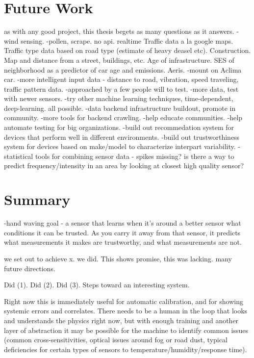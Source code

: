 \section{Future Work}

as with any good project, this thesis begets as many questions as it answers.
-wind sensing.
-pollen, scrape. no api.  realtime Traffic data a la google maps.  Traffic type data based on road type (estimate of heavy deasel etc).  Construction.  Map and distance from a street, buildings, etc.  Age of infrastructure.  SES of neighborhood as a predictor of car age and emissions.  Aeris.
-mount on Aclima car.
-more intelligent input data - distance to road, vibration, speed traveling, traffic pattern data.
-approached by a few people will to test.
-more data, test with newer sensors.
-try other machine learning techniques, time-dependent, deep-learning.  all possible.
-data backend infrastructure buildout, promote in community.
-more tools for backend crawling.
-help educate communities.
-help automate testing for big organizations.
-build out recommedation system for devices that perform well in different environments.
-build out trustworthiness system for devices based on make/model to characterize interpart variability.
-statistical tools for combining sensor data - spikes missing?  is there a way to predict frequency/intensity in an area by looking at closest high quality sensor?


\section{Summary}

-hand waving goal - a sensor that learns when it's around a better sensor what conditions it can be trusted.  As you carry it away from that sensor, it predicts what measurements it makes are trustworthy, and what measurements are not.

we set out to achieve x.  we did.  This shows promise, this was lacking.  many future directions.

Did (1). Did (2).  Did (3).  Steps toward an interesting system.

Right now this is immediately useful for automatic calibration, and for showing systemic errors and correlates.  There needs to be a human in the loop that looks and understands the physics right now, but with enough training and another layer of abstraction it may be possible for the machine to identify common issues (common cross-sensitivities, optical issues around fog or road dust, typical deficiencies for certain types of sensors to temperature/humidity/response time).



